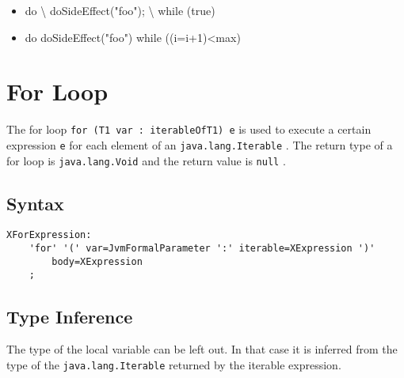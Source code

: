 \documentclass[a4paper,10pt]{scrreprt}
\newlength{\itemindentlen}
\begin{document}
\setlength{\itemindentlen}{\textwidth}
\begin{itemize}
\addtolength{\itemindentlen}{-2em}

\item \begin{minipage}[t]{\itemindentlen}

	do \textbackslash{}{
		doSideEffect("foo");
	\textbackslash{}} while (true)
	
\end{minipage}

\item \begin{minipage}[t]{\itemindentlen}

	do doSideEffect("foo") while ((i=i+1)<max)
	
\end{minipage}

\end{itemize}
\addtolength{\itemindentlen}{2em}







\section{For Loop\label{ForLoop}}
The for loop \lstinline{for (T1 var : iterableOfT1) e}
 is used to execute a certain expression \lstinline{e}
 for each element of an \lstinline{java.lang.Iterable}
.
The return type of a for loop is \lstinline{java.lang.Void}
 and the return value is \lstinline{null}
.

\subsection{Syntax}
\begin{lstlisting}
XForExpression:
	'for' '(' var=JvmFormalParameter ':' iterable=XExpression ')' 
		body=XExpression
	;

\end{lstlisting}
 




\subsection{Type Inference}
The type of the local variable can be left out. In that case it is inferred from the type of the \lstinline{java.lang.Iterable}
 returned by the iterable expression.
\end{document}
